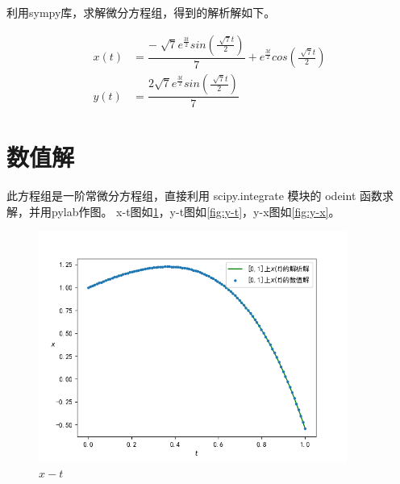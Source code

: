 利用sympy库，求解微分方程组，得到的解析解如下。

\begin{equation}
    \begin{aligned}
        x(t) &=\dfrac{-\sqrt[]{7}e^{\frac{3t}{2}}sin(\frac{\sqrt[]{7}t}{2})}{7} + e^{\frac{3t}{2}}cos(\frac{\sqrt[]{7}t}{2})\\
        y(t) &= \dfrac{2\sqrt{7}e^{\frac{3t}{2}}sin(\frac{\sqrt[]{7}t}{2})}{7}
    \end{aligned}
\end{equation}

\section{数值解}

此方程组是一阶常微分方程组，直接利用 scipy.integrate 模块的 odeint 函数求解，并用pylab作图。
x-t图如\ref{fig:x-t}，y-t图如\ref{fig:y-t}，y-x图如\ref{fig:y-x}。

\begin{figure}[htbp]
    \begin{center}
        \includegraphics[width=0.9\textwidth]{x-t.png}
    \end{center}
   \caption[]{$x-t$}
    \label{fig:x-t}
\end{figure}

